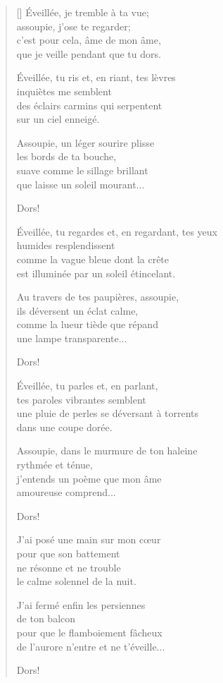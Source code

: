 \documentclass[a4paper,12pt]{book}
\begin{document}
\begin{verse}[\versewidth]
  Éveillée, je tremble à ta vue; \\
  assoupie, j'ose te regarder; \\
  c'est pour cela, âme de mon âme, \\
  que je veille pendant que tu dors.

  Éveillée, tu ris et, en riant, tes lèvres \\
  inquiètes me semblent \\
  des éclairs carmins qui serpentent \\
  sur un ciel enneigé.

  Assoupie, un léger sourire plisse \\
  les bords de ta bouche, \\
  suave comme le sillage brillant \\
  que laisse un soleil mourant...

  Dors!

  Éveillée, tu regardes et, en regardant, tes yeux \\
  humides resplendissent \\
  comme la vague bleue dont la crête \\
  est illuminée par un soleil étincelant.

  Au travers de tes paupières, assoupie, \\
  ils déversent un éclat calme, \\
  comme la lueur tiède que répand \\
  une lampe transparente...

  Dors!

  Éveillée, tu parles et, en parlant, \\
  tes paroles vibrantes semblent \\
  une pluie de perles se déversant à torrents \\
  dans une coupe dorée.

  Assoupie, dans le murmure de ton haleine \\
  rythmée et ténue, \\
  j'entends un poème que mon âme \\
  amoureuse comprend...

  Dors!

  J'ai posé une main sur mon cœur \\
  pour que son battement \\
  ne résonne et ne trouble \\
  le calme solennel de la nuit.

  J'ai fermé enfin les persiennes \\
  de ton balcon \\
  pour que le flamboiement fâcheux \\
  de l'aurore n'entre et ne t'éveille...

  Dors!
\end{verse}
\end{document}
